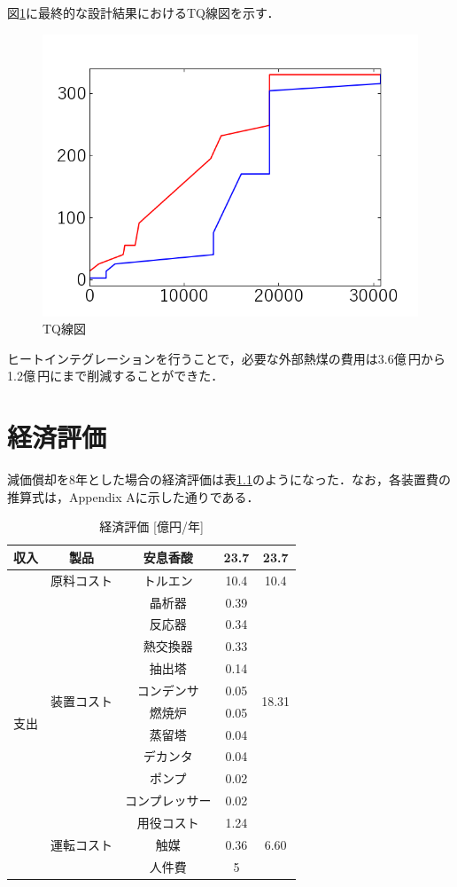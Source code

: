 \documentclass[a4j]{jsreport}
\begin{document}
図\ref{TQ線図}に最終的な設計結果におけるTQ線図を示す．
\begin{figure}[htbp]
  \centering
  \includegraphics[scale=0.7]{TQ.png}
  \caption{TQ線図}
  \label{TQ線図}
\end{figure}

ヒートインテグレーションを行うことで，必要な外部熱煤の費用は3.6億\,円から1.2億\,円にまで削減することができた．

\clearpage
\chapter{経済評価}
減価償却を8年とした場合の経済評価は表\ref{経済評価}のようになった．なお，各装置費の推算式は，Appendix Aに示した通りである．
\begin{table}[htbp]
    \centering
    \caption{経済評価 [億円/年]}
    \label{経済評価}
    \begin{tabular}{c|c|cc|c}
      \hline
      収入 & 製品 & 安息香酸 & 23.7 & 23.7 \\
      \hline
      \multirow{14}{*}{支出} & 原料コスト & トルエン & 10.4 & 10.4 \\
      \cline{2-5}
      & \multirow{10}{*}{装置コスト} & 晶析器 & 0.39 & \multirow{10}{*}{18.31} \\
      & & 反応器 & 0.34 & \\
      & & 熱交換器 & 0.33 & \\
      & & 抽出塔 & 0.14 & \\
      & & コンデンサ & 0.05 & \\
      & & 燃焼炉 & 0.05 & \\
      & & 蒸留塔 & 0.04 & \\
      & & デカンタ & 0.04 & \\
      & & ポンプ & 0.02 & \\
      & & コンプレッサー & 0.02 & \\
      \cline{2-5}
      & \multirow{3}{*}{運転コスト} & 用役コスト & 1.24 & \multirow{3}{*}{6.60} \\
      & & 触媒 & 0.36 & \\
      & & 人件費 & 5 & \\
      \hline
    \end{tabular}
\end{table}
\end{document}
